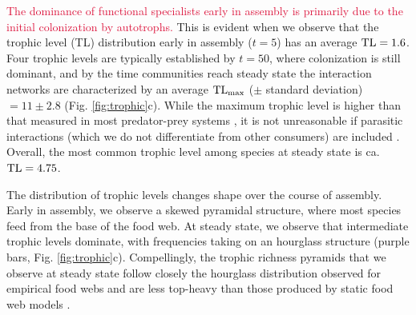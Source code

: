 \documentclass[twocolumn,preprintnumbers,amsmath,amssymb,superscriptaddress,linenumbers]{revtex4-1}
\newcommand{\rev}[1]{\textcolor{crimson}{#1}}
\begin{document}


\rev{The dominance of functional specialists early in assembly is primarily due to the initial colonization by autotrophs.}
This is evident when we observe that the trophic level (TL) distribution early in assembly ($t=5$) has an average ${\rm TL}=1.6$.
Four trophic levels are typically established by $t=50$, where colonization is still dominant, and by the time communities reach steady state the interaction networks are characterized by an average ${\rm TL_{max}}$ ($\pm$ standard deviation) $=11 \pm 2.8$ (Fig. \ref{fig:trophic}c).
While the maximum trophic level is higher than that measured in most predator-prey systems \cite{Williams2002}, it is not unreasonable if parasitic interactions (which we do not differentiate from other consumers) are included \cite{Lafferty2006}.
Overall, the most common trophic level among species at steady state is ca. ${\rm TL}=4.75$. %

The distribution of trophic levels changes shape over the course of assembly.
Early in assembly, we observe a skewed pyramidal structure, where most species feed from the base of the food web.
At steady state, we observe that intermediate trophic levels dominate, with frequencies taking on an hourglass structure (purple bars, Fig. \ref{fig:trophic}c).
Compellingly, the trophic richness pyramids that we observe at steady state follow closely the hourglass distribution observed for empirical food webs and are less top-heavy than those produced by static food web models \cite{Turney2016}.\\
\end{document}
